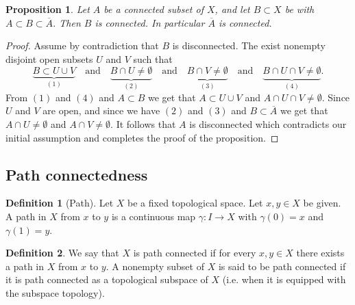 \documentclass[11pt,a4paper]{article}
\theoremstyle{definition}
\newtheorem{definition}{Definition}[section]
\theoremstyle{plain}
\newtheorem{proposition}[theorem]{Proposition}
\newcommand{\tand}{\quad \text{and} \quad}
\begin{document}
  \begin{proposition}
    Let $A$ be a connected subset of $X$, and let $B \subset X$ be with
    $A \subset B \subset \overline A$.
    Then $B$ is connected.
    In particular $\overline A$ is connected.
  \end{proposition}
  \begin{proof}
    Assume by contradiction that $B$ is disconnected.
    The exist nonempty disjoint open subsets $U$ and $V$ such that
    \[
      \underbrace{B \subset U \cup V}_{(1)} \tand
      \underbrace{B \cap U \neq \emptyset}_{(2)} \tand
      \underbrace{B \cap V \neq \emptyset}_{(3)} \tand
      \underbrace{B \cap U \cap V \neq \emptyset}_{(4)}.
    \]
    From $(1)$ and $(4)$ and $A \subset B$ we get that
    $A \subset U \cup V$ and $A \cap U \cap V \neq \emptyset$.
    Since $U$ and $V$ are open, and since we have $(2)$ and $(3)$ and
    $B \subset \overline A$ we get that $A \cap U \neq \emptyset$ and
    $A \cap V \neq \emptyset$.
    It follows that $A$ is disconnected which contradicts our initial
    assumption and completes the proof of the proposition.
  \end{proof}

  \subsection{Path connectedness}

  \begin{definition}[Path]
    Let $X$ be a fixed topological space.
    Let $x, y \in X$ be given.
    A path in $X$ from $x$ to $y$ is a continuous map
    $\gamma \colon I \to X$ with $\gamma(0) = x$ and $\gamma(1) = y$.
  \end{definition}
  
  \begin{definition}
    We say that $X$ is path connected if for every $x, y \in X$ there exists
    a path in $X$ from $x$ to $y$.
    A nonempty subset of $X$ is said to be path connected if it is
    path connected as a topological subspace of $X$
    (i.e. when it is equipped with the subspace topology).
  \end{definition}
\end{document}
